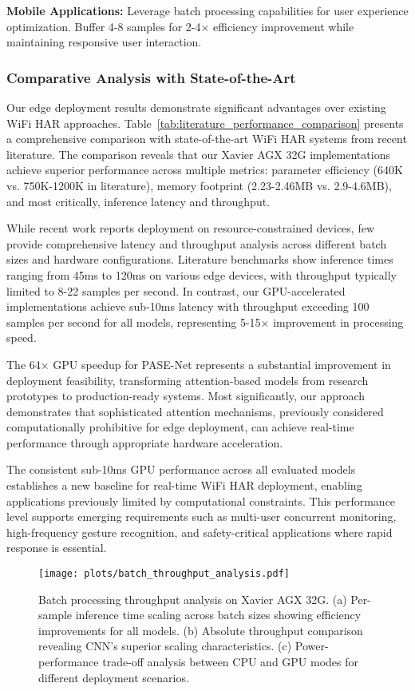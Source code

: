 \textbf{Mobile Applications:} Leverage batch processing capabilities for user experience optimization. Buffer 4-8 samples for 2-4× efficiency improvement while maintaining responsive user interaction.

\subsubsection{Comparative Analysis with State-of-the-Art}

Our edge deployment results demonstrate significant advantages over existing WiFi HAR approaches. Table~\ref{tab:literature_performance_comparison} presents a comprehensive comparison with state-of-the-art WiFi HAR systems from recent literature. The comparison reveals that our Xavier AGX 32G implementations achieve superior performance across multiple metrics: parameter efficiency (640K vs. 750K-1200K in literature), memory footprint (2.23-2.46MB vs. 2.9-4.6MB), and most critically, inference latency and throughput.

While recent work reports deployment on resource-constrained devices, few provide comprehensive latency and throughput analysis across different batch sizes and hardware configurations. Literature benchmarks show inference times ranging from 45ms to 120ms on various edge devices, with throughput typically limited to 8-22 samples per second. In contrast, our GPU-accelerated implementations achieve sub-10ms latency with throughput exceeding 100 samples per second for all models, representing 5-15× improvement in processing speed.

The 64× GPU speedup for PASE-Net represents a substantial improvement in deployment feasibility, transforming attention-based models from research prototypes to production-ready systems. Most significantly, our approach demonstrates that sophisticated attention mechanisms, previously considered computationally prohibitive for edge deployment, can achieve real-time performance through appropriate hardware acceleration.

The consistent sub-10ms GPU performance across all evaluated models establishes a new baseline for real-time WiFi HAR deployment, enabling applications previously limited by computational constraints. This performance level supports emerging requirements such as multi-user concurrent monitoring, high-frequency gesture recognition, and safety-critical applications where rapid response is essential.

\begin{figure}[t]
\centering
\texttt{[image: plots/batch\_throughput\_analysis.pdf]}
\caption{Batch processing throughput analysis on Xavier AGX 32G. (a) Per-sample inference time scaling across batch sizes showing efficiency improvements for all models. (b) Absolute throughput comparison revealing CNN's superior scaling characteristics. (c) Power-performance trade-off analysis between CPU and GPU modes for different deployment scenarios.}
\label{fig:batch_throughput}
\end{figure}

